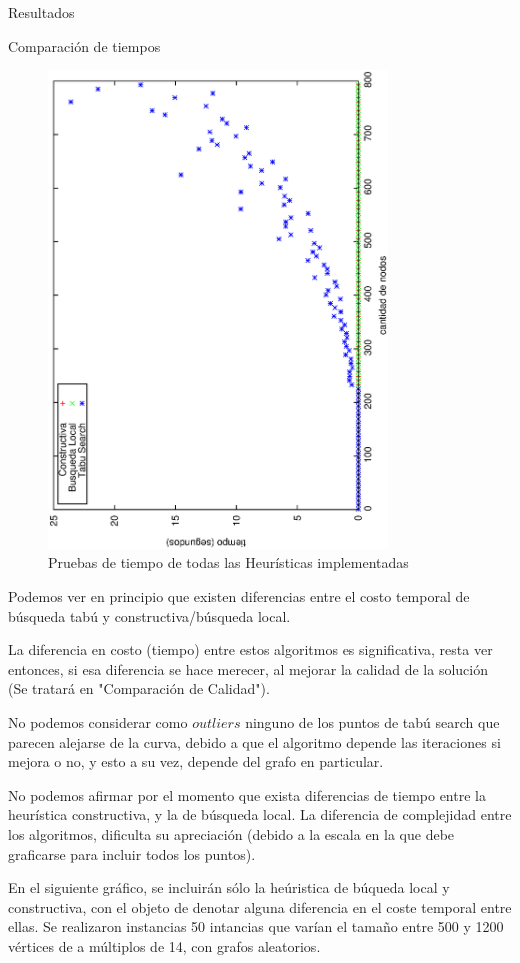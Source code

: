 \documentclass[12pt,titlepage]{article}
\begin{document}
\begin{section}{Resultados}
\begin{subsection}{Comparación de tiempos}
		\begin{figure}[H]
			\centering
					\includegraphics[width=9cm,angle=-90]{conclusiones/heuris.eps}
			\caption{Pruebas de tiempo de todas las Heurísticas implementadas}
			\label{fig:Tiempo de Heuristicas}
		\end{figure}
		
		Podemos ver en principio que existen diferencias entre el costo temporal de búsqueda tabú y constructiva/búsqueda local.
		
		La diferencia en costo (tiempo) entre estos algoritmos es significativa, resta ver entonces, si esa diferencia se hace merecer, al mejorar la calidad de la solución (Se tratará en "Comparación de Calidad").
		
		No podemos considerar como $outliers$ ninguno de los puntos de tabú search que parecen alejarse de la curva, debido a que el algoritmo depende las iteraciones si mejora o no, y esto a su vez, depende del grafo en particular.
		
		No podemos afirmar por el momento que exista diferencias de tiempo entre la heurística constructiva, y la de búsqueda local. La diferencia de complejidad entre los algoritmos, dificulta su apreciación (debido a la escala en la que debe graficarse para incluir todos los puntos).
		
		En el siguiente gráfico, se incluirán sólo la heúristica de búqueda local y constructiva, con el objeto de denotar alguna diferencia en el coste temporal entre ellas. Se realizaron instancias 50 intancias que varían el tamaño entre 500 y 1200 vértices de a múltiplos de 14, con grafos aleatorios.


\end{subsection}
\end{section}
\end{document}
